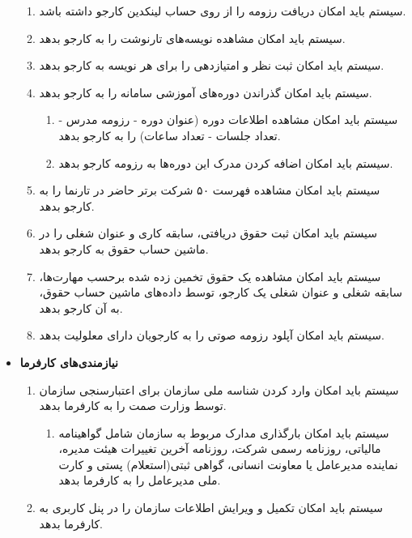 \documentclass[12pt]{article}
\begin{document}
\begin{itemize}
\begin{enumerate}
			\item سیستم باید امکان دریافت رزومه را از روی حساب لینکدین کارجو داشته باشد.
			\item سیستم باید امکان مشاهده نویسه‌های تارنوشت را به کارجو بدهد.
			\item سیستم باید امکان ثبت نظر و امتیازدهی را برای هر نویسه به کارجو بدهد.
			\item سیستم باید امکان گذراندن دوره‌های آموزشی سامانه را به کارجو بدهد.
			\begin{enumerate}
				\renewcommand{\labelenumii}{-R\arabic{enumi}.\arabic{enumii}}
				\item سیستم باید امکان مشاهده اطلاعات دوره (عنوان دوره - رزومه مدرس - تعداد جلسات - تعداد ساعات) را به کارجو بدهد.
				\item سیستم باید امکان اضافه کردن مدرک این دوره‌ها به رزومه کارجو بدهد.
			\end{enumerate}
			\item سیستم باید امکان مشاهده فهرست ۵۰ شرکت برتر حاضر در تارنما را به کارجو بدهد.
			\item سیستم باید امکان ثبت حقوق دریافتی، سابقه کاری و عنوان شغلی را در ماشین حساب حقوق به کارجو بدهد.
			\item سیستم باید امکان مشاهده یک حقوق تخمین زده شده برحسب مهارت‌ها، سابقه شغلی و عنوان شغلی یک کارجو، توسط داده‌های ماشین حساب حقوق، به آن کارجو بدهد.
			\item سیستم باید امکان آپلود رزومه صوتی را به کارجویان دارای معلولیت بدهد.
		\end{enumerate}
		\item
		\textbf{نیازمندی‌های کارفرما}
		\begin{enumerate}
			\renewcommand{\labelenumi}{-R\arabic{enumi}}
			\setcounter{enumi}{65}
			\item سیستم باید امکان وارد کردن شناسه ملی سازمان برای اعتبارسنجی سازمان توسط وزارت صمت را به کارفرما بدهد.
			\begin{enumerate}
				\renewcommand{\labelenumii}{-R\arabic{enumi}.\arabic{enumii}}
				\item سیستم باید امکان بارگذاری مدارک مربوط به سازمان شامل گواهینامه مالیاتی، روزنامه رسمی شرکت، روزنامه آخرین تغییرات هیئت مدیره، نماینده مدیرعامل یا معاونت انسانی، گواهی ثبتی(استعلام) پستی و کارت ملی مدیرعامل را به کارفرما بدهد.
			\end{enumerate}
			\item سیستم باید امکان تکمیل و ویرایش اطلاعات سازمان را در پنل کاربری به کارفرما بدهد.
			\begin{enumerate}
				\renewcommand{\labelenumii}{-R\arabic{enumi}.\arabic{enumii}}

\end{enumerate}
\end{enumerate}
\end{itemize}
\end{document}

